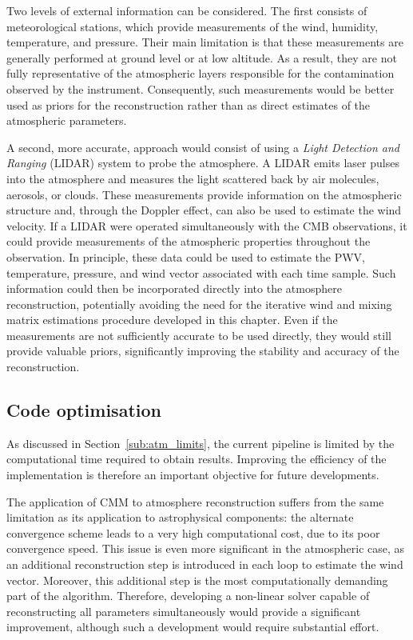 \documentclass[../../thesis.tex]{subfiles}
\begin{document}
Two levels of external information can be considered. The first consists of meteorological stations, which provide measurements of the wind, humidity, temperature, and pressure. Their main limitation is that these measurements are generally performed at ground level or at low altitude. As a result, they are not fully representative of the atmospheric layers responsible for the contamination observed by the instrument. Consequently, such measurements would be better used as priors for the reconstruction rather than as direct estimates of the atmospheric parameters.

A second, more accurate, approach would consist of using a \emph{Light Detection and Ranging} (LIDAR) system to probe the atmosphere. A LIDAR emits laser pulses into the atmosphere and measures the light scattered back by air molecules, aerosols, or clouds. These measurements provide information on the atmospheric structure and, through the Doppler effect, can also be used to estimate the wind velocity.
If a LIDAR were operated simultaneously with the CMB observations, it could provide measurements of the atmospheric properties throughout the observation. In principle, these data could be used to estimate the PWV, temperature, pressure, and wind vector associated with each time sample. Such information could then be incorporated directly into the atmosphere reconstruction, potentially avoiding the need for the iterative wind and mixing matrix estimations procedure developed in this chapter. Even if the measurements are not sufficiently accurate to be used directly, they would still provide valuable priors, significantly improving the stability and accuracy of the reconstruction.

\subsection{Code optimisation}

As discussed in Section~\ref{sub:atm_limits}, the current pipeline is limited by the computational time required to obtain results. Improving the efficiency of the implementation is therefore an important objective for future developments.

The application of CMM to atmosphere reconstruction suffers from the same limitation as its application to astrophysical components: the alternate convergence scheme leads to a very high computational cost, due to its poor convergence speed. This issue is even more significant in the atmospheric case, as an additional reconstruction step is introduced in each loop to estimate the wind vector. Moreover, this additional step is the most computationally demanding part of the algorithm. Therefore, developing a non-linear solver capable of reconstructing all parameters simultaneously would provide a significant improvement, although such a development would require substantial effort.
\end{document}
